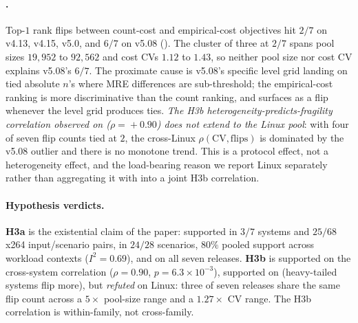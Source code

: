 \paragraph*{\StudyLinux.}
Top-$1$ rank flips between count-cost and empirical-cost objectives
hit $2/7$ on v4.13, v4.15, v5.0, and $6/7$ on v5.08
(). The cluster of three at $2/7$ spans
pool sizes $19{,}952$ to $92{,}562$ and cost CVs $1.12$ to $1.43$,
so neither pool size nor cost CV explains v5.08's $6/7$. The
proximate cause is v5.08's specific level grid landing on tied
absolute $n$'s where MRE differences are sub-threshold; the
empirical-cost ranking is more discriminative than the count
ranking, and surfaces as a flip whenever the level grid produces
ties. \emph{The H3b heterogeneity-predicts-fragility correlation
observed on \StudyReplication ($\rho\!=\!+0.90$) does not extend to the Linux
pool}: with four of seven flip counts tied at $2$, the cross-Linux
$\rho(\mathrm{CV}, \text{flips})$ is dominated by the v5.08 outlier
and there is no monotone trend. This is a protocol effect, not a
heterogeneity effect, and the load-bearing reason we report Linux
separately rather than aggregating it with \StudyReplication into a joint H3b
correlation.


\paragraph*{Hypothesis verdicts.}
\textbf{H3a} is the existential claim of the paper: supported in
$3/7$ \StudyReplication systems and $25/68$ x264 input/scenario pairs, in
$24/28$ \StudyEnergy scenarios, $80\%$ pooled support across workload
contexts ($I^{2}\!=\!0.69$), and on all seven \StudyLinux releases.
\textbf{H3b} is supported on the cross-system \StudyReplication correlation
($\rho\!=\!0.90$, $p\!=\!6.3\!\times\!10^{-3}$), supported on \StudyEnergy
(heavy-tailed systems flip more), but \emph{refuted} on Linux: three
of seven \StudyLinux releases share the same flip count across a $5\times$
pool-size range and a $1.27\times$ CV range. The H3b correlation is
within-family, not cross-family.

